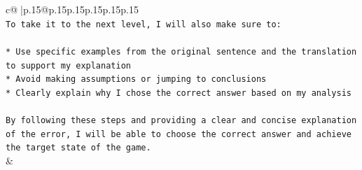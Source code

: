 \documentclass{article}
\begin{document}
{\begin{supertabular}{c@{$\;$}|p{.15\linewidth}@{}p{.15\linewidth}p{.15\linewidth}p{.15\linewidth}p{.15\linewidth}p{.15\linewidth}}
{{{\\ 
\texttt{To take it to the next level, I will also make sure to:} \\
\\ 
\texttt{* Use specific examples from the original sentence and the translation to support my explanation} \\
\texttt{* Avoid making assumptions or jumping to conclusions} \\
\texttt{* Clearly explain why I chose the correct answer based on my analysis} \\
\\ 
\texttt{By following these steps and providing a clear and concise explanation of the error, I will be able to choose the correct answer and achieve the target state of the game.} \\
            }
        }
    }
    & \\ \\

\end{supertabular}
}
\end{document}
